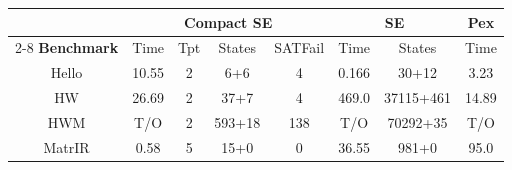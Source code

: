 \documentclass{sig-alternate}%
\begin{document}
\begin{table}[!t]
  \begin{center}
    \setlength{\tabcolsep}{6pt}
    \renewcommand\arraystretch{1.2}
    \begin{tabular}{|c||c|c|c|c||c|c||c|}
      \hline
      & \multicolumn{4}{c||}{\textbf{Compact SE}} & \multicolumn{2}{c||}{\textbf{SE}} & \textbf{Pex} \\
      \cline{2-8}
      \textbf{Benchmark} & Time & Tpt & States & SATFail & Time & States  & Time \\
      \hline
      Hello   & 10.55 &  2 &      6+6 &   4 &  0.166 &        30+12 &  3.23 \\
      HW      & 26.69 &  2 &     37+7 &   4 &  469.0 &    37115+461 & 14.89 \\
      HWM     &   T/O &  2 &   593+18 & 138 &    T/O &     70292+35 &   T/O \\
      MatrIR  &  0.58 &  5 &     15+0 &   0 &  36.55 &        981+0 &  95.0 \\

\end{tabular}
\end{center}
\end{table}
\end{document}
